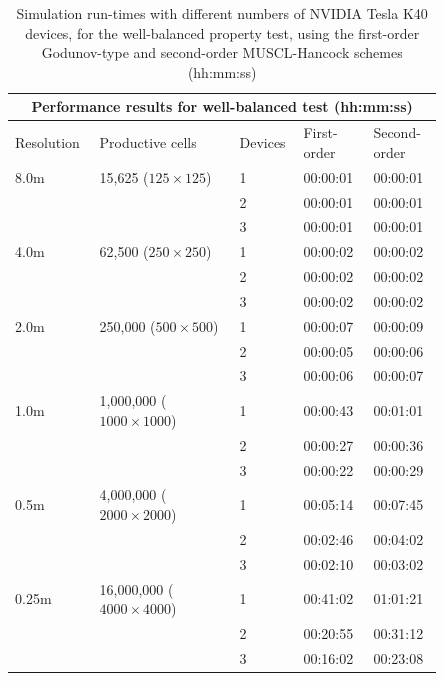 \begin{table}[p]
	\small
	\centering
	\caption{Simulation run-times with different numbers of NVIDIA Tesla K40 devices, for the well-balanced property test, using the first-order Godunov-type and second-order MUSCL-Hancock schemes (hh:mm:ss)}
	\label{PerformanceResults_MultiGPU_WellBalanced}
	\begin{tabular}{p{0.15\linewidth}p{0.3\linewidth}p{0.1\linewidth}p{0.15\linewidth}p{0.15\linewidth}}
		\hline
		\multicolumn{5}{c}{\textbf{Performance results for well-balanced test (hh:mm:ss)}} \\
		\hline
		Resolution		 	& Productive cells					& Devices	& First-order	& Second-order	\\
		\hline
		8.0m				& 15,625 ($125 \times 125$)			& 1			& 00:00:01		& 00:00:01	\\
		&									& 2			& 00:00:01		& 00:00:01	\\
		&									& 3			& 00:00:01		& 00:00:01 	\\
		\hline
		4.0m				& 62,500 ($250 \times 250$)			& 1			& 00:00:02		& 00:00:02	\\
		&									& 2			& 00:00:02		& 00:00:02	\\
		&									& 3			& 00:00:02		& 00:00:02	\\
		\hline
		2.0m				& 250,000 ($500 \times 500$)		& 1			& 00:00:07		& 00:00:09 	\\
		&									& 2			& 00:00:05		& 00:00:06	\\
		&									& 3			& 00:00:06		& 00:00:07  \\
		\hline
		1.0m				& 1,000,000 ($1000 \times 1000$)	& 1			& 00:00:43		& 00:01:01	\\
		&									& 2			& 00:00:27		& 00:00:36	\\
		&									& 3			& 00:00:22		& 00:00:29	\\
		\hline
		0.5m				& 4,000,000 ($2000 \times 2000$)	& 1			& 00:05:14		& 00:07:45	\\
		&									& 2			& 00:02:46		& 00:04:02	\\
		&									& 3			& 00:02:10		& 00:03:02	\\
		\hline
		0.25m				& 16,000,000 ($4000 \times 4000$)	& 1			& 00:41:02		& 01:01:21	\\
		&									& 2			& 00:20:55		& 00:31:12	\\
		&									& 3			& 00:16:02		& 00:23:08	\\
		\hline
	\end{tabular}
\end{table}

